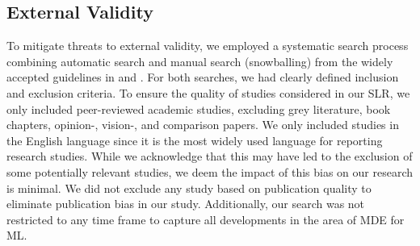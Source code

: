 \subsection{External Validity}
To mitigate threats to external validity, we employed a systematic search process combining automatic search and manual search (snowballing) from the widely accepted guidelines in \cite{kitchenham2009systematic} and \cite{wohlin2014guidelines}. For both searches, we had clearly defined inclusion and exclusion criteria. To ensure the quality of studies considered in our SLR, we only included peer-reviewed academic studies, excluding grey literature, book chapters, opinion-, vision-, and comparison papers. %
We only included studies in the English language since it is the most widely used language for reporting research studies. While we acknowledge that this may have led to the exclusion of some potentially relevant studies, we deem the impact of this bias on our research is minimal. We did not exclude any study based on publication quality to eliminate publication bias in our study. Additionally, our search was not restricted to any time frame to capture all developments in the area of MDE for ML.


